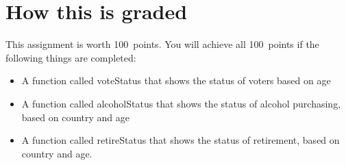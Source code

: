 \documentclass{article}
\newcommand{\AValue}{100}
\begin{document}
\section*{How this is graded}
This assignment is worth \AValue \ points. You will achieve all \AValue \   points if the following things are completed:
\begin{itemize}
    \item A function called voteStatus that shows the status of voters based on age
    \item A function called alcoholStatus that shows the status of alcohol purchasing, based on country and age
    \item A function called retireStatus that shows the status of retirement, based on country and age.
\end{itemize}
\end{document}
